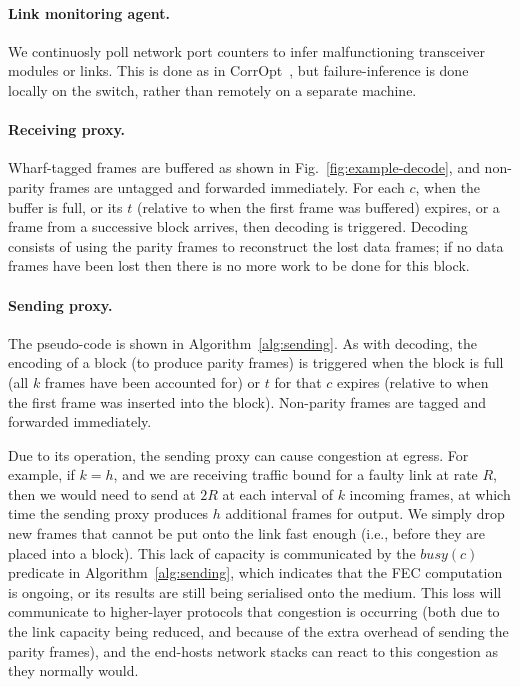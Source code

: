\documentclass[sigconf]{acmart}
\newcommand{\OurSys}{Wharf\xspace}
\begin{document}
\paragraph{Link monitoring agent.}
  We continuosly poll network port counters to infer malfunctioning transceiver
  modules or links. This is done as in
  CorrOpt~\cite{Zhuo:2017:UMP:3098822.3098849}, but failure-inference is done
  locally on the switch, rather than remotely on a separate machine.

\paragraph{Receiving proxy.}
\OurSys-tagged frames are buffered as shown in Fig.~\ref{fig:example-decode},
and non-parity frames are untagged and forwarded immediately.
For each $c$, when the buffer is full, or its $t$ (relative to when the first
frame was buffered) expires, or a frame from a successive block arrives, then
decoding is triggered. Decoding consists of using the parity frames to
reconstruct the lost data frames; if no data frames have been lost then there
is no more work to be done for this block.

\paragraph{Sending proxy.}
The pseudo-code is shown in Algorithm~\ref{alg:sending}.
As with decoding, the encoding of a block (to produce parity frames) is
triggered when the block is full (all $k$ frames have been accounted for) or
$t$ for that $c$ expires (relative to when the first frame was inserted into
the block). Non-parity frames are tagged and forwarded immediately.

Due to its operation, the sending proxy can cause congestion at egress.
For example, if $k = h$, and we are receiving traffic bound for
a faulty link at rate $R$, then we would need to send at $2R$ at each interval
of $k$ incoming frames, at which time the sending proxy produces $h$ additional
frames for output. We simply drop new frames that cannot be put onto the link
fast enough (i.e., before they are placed into a block). This lack of capacity
is communicated by the $\mathit{busy}(c)$ predicate in
Algorithm~\ref{alg:sending}, which indicates that the FEC computation is
ongoing, or its results are still being serialised onto the medium. This loss
will communicate to higher-layer protocols that congestion is occurring (both
due to the link capacity being reduced, and because of the extra overhead of
sending the parity frames), and the end-hosts network stacks can react to this
congestion as they normally would.
\end{document}
